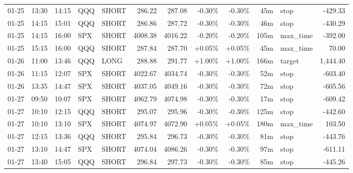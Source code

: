 \documentclass[11pt,a4paper,twoside]{article}
\begin{document}
\begin{center}
\begin{longtable}{>{\color{txtmain}}l l l l l r r r r r >{\color{txtmain}}l r}
01-25 & 13:30 & 14:15 & QQQ & SHORT & 286.22 & 287.08 & \textcolor{lossred}{-0.30\%} & \textcolor{lossred}{-0.30\%} & 45m & stop & \textcolor{lossred}{-429.33} \\
01-25 & 14:15 & 15:01 & QQQ & SHORT & 286.86 & 287.72 & \textcolor{lossred}{-0.30\%} & \textcolor{lossred}{-0.30\%} & 46m & stop & \textcolor{lossred}{-430.29} \\
01-25 & 14:15 & 16:00 & SPX & SHORT & 4008.38 & 4016.22 & \textcolor{lossred}{-0.20\%} & \textcolor{lossred}{-0.20\%} & 105m & max\_time & \textcolor{lossred}{-392.00} \\
01-25 & 15:15 & 16:00 & QQQ & SHORT & 287.84 & 287.70 & \textcolor{wingreen}{+0.05\%} & \textcolor{wingreen}{+0.05\%} & 45m & max\_time & \textcolor{wingreen}{70.00} \\
01-26 & 11:00 & 13:46 & QQQ & LONG & 288.88 & 291.77 & \textcolor{wingreen}{+1.00\%} & \textcolor{wingreen}{+1.00\%} & 166m & target & \textcolor{wingreen}{1,444.40} \\
01-26 & 11:15 & 12:07 & SPX & SHORT & 4022.67 & 4034.74 & \textcolor{lossred}{-0.30\%} & \textcolor{lossred}{-0.30\%} & 52m & stop & \textcolor{lossred}{-603.40} \\
01-26 & 13:35 & 14:47 & SPX & SHORT & 4037.05 & 4049.16 & \textcolor{lossred}{-0.30\%} & \textcolor{lossred}{-0.30\%} & 72m & stop & \textcolor{lossred}{-605.56} \\
01-27 & 09:50 & 10:07 & SPX & SHORT & 4062.79 & 4074.98 & \textcolor{lossred}{-0.30\%} & \textcolor{lossred}{-0.30\%} & 17m & stop & \textcolor{lossred}{-609.42} \\
01-27 & 10:10 & 12:15 & QQQ & SHORT & 295.07 & 295.96 & \textcolor{lossred}{-0.30\%} & \textcolor{lossred}{-0.30\%} & 125m & stop & \textcolor{lossred}{-442.60} \\
01-27 & 10:10 & 13:10 & SPX & SHORT & 4074.97 & 4072.90 & \textcolor{wingreen}{+0.05\%} & \textcolor{wingreen}{+0.05\%} & 180m & max\_time & \textcolor{wingreen}{103.50} \\
01-27 & 12:15 & 13:36 & QQQ & SHORT & 295.84 & 296.73 & \textcolor{lossred}{-0.30\%} & \textcolor{lossred}{-0.30\%} & 81m & stop & \textcolor{lossred}{-443.76} \\
01-27 & 13:10 & 14:47 & SPX & SHORT & 4074.04 & 4086.26 & \textcolor{lossred}{-0.30\%} & \textcolor{lossred}{-0.30\%} & 97m & stop & \textcolor{lossred}{-611.11} \\
01-27 & 13:40 & 15:05 & QQQ & SHORT & 296.84 & 297.73 & \textcolor{lossred}{-0.30\%} & \textcolor{lossred}{-0.30\%} & 85m & stop & \textcolor{lossred}{-445.26} \\

\end{longtable}
\end{center}
\end{document}
